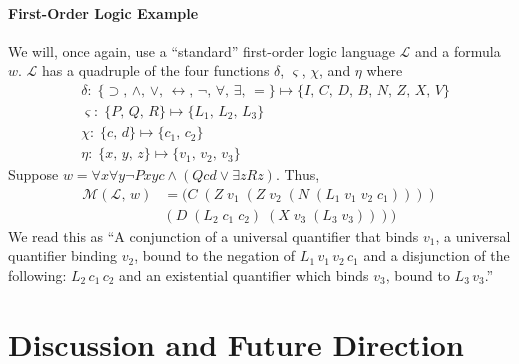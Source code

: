 \documentclass[ms]{uncgdissertationexp2}
\theoremstyle{plain}
\theoremstyle{definition}
\theoremstyle{remark}
\begin{document}
\subsubsection{First-Order Logic Example} We will, once again, use a ``standard'' first-order logic language $\mathcal{L}$ and a formula $w$. $\mathcal{L}$ has a quadruple of the four functions $\delta$, $\varsigma$, $\chi$, and $\eta$ where
\begin{align*}
	  & \delta:\;\{\supset,\,\land,\,\lor,\,\leftrightarrow,\,\lnot,\,\forall,\,\exists,\,=\}\mapsto \{I,\,C,\,D,\,B,\,N,\,Z,\,X,\,V\} \\
	  & \varsigma:\;\{P,\,Q,\,R\} \mapsto \{L_{1},\,L_{2},\,L_{3}\}                                                                       \\
	  & \chi:\;\{c,\,d\} \mapsto \{c_1,\,c_2\}                                                                                       \\
	  & \eta:\;\{x,\,y,\,z\} \mapsto \{v_1,\,v_2,\,v_3\}                                                                             
\end{align*}
Suppose $w = \forall{x}\forall{y}\lnot{Pxyc} \land (Qcd \lor \exists{z}Rz)$. Thus,
\begin{align*}
	\mathcal{M}(\mathcal{L},\,w) & = (C\;(Z\;v_1\;(Z\;v_2\;(N\;(L_1\;v_1\;v_2\;c_1)))) \\
	                   & (D\;(L_2\;c_1\;c_2)\;(X\;v_3\;(L_3\;v_3))))         
\end{align*}
We read this as ``A conjunction of a universal quantifier that binds $v_1$, a universal quantifier binding $v_2$, bound to the negation of $L_1\,v_1\,v_2\,c_1$ and a disjunction of the following: $L_2\,c_1\,c_2$ and an existential quantifier which binds $v_3$, bound to $L_3\,v_3$.''

\chapter{Discussion and Future Direction}



\nocite{*}

\appendix
\end{document}

